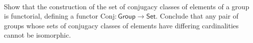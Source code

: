 \documentclass[../../main]{subfiles}
\begin{document}

\paragraph{}
\begin{exercise}
	Show that the construction of the set of conjugacy classes of elements of a
	group is functorial, defining a functor
	\(\mathrm{Conj}\colon\mathsf{Group\to Set}\). Conclude that any pair of
	groups whose sets of conjugacy classes of elements have differing
	cardinalities cannot be isomorphic.
\end{exercise}
\end{document}
